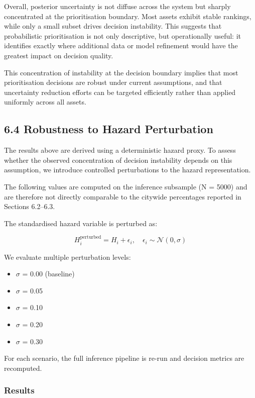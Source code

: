 \documentclass[
]{article}
\providecommand{\tightlist}{%
  \setlength{\itemsep}{0pt}\setlength{\parskip}{0pt}}
\begin{document}
Overall, posterior uncertainty is not diffuse across the system but
sharply concentrated at the prioritisation boundary. Most assets exhibit
stable rankings, while only a small subset drives decision instability.
This suggests that probabilistic prioritisation is not only descriptive,
but operationally useful: it identifies exactly where additional data or
model refinement would have the greatest impact on decision quality.

This concentration of instability at the decision boundary implies that
most prioritisation decisions are robust under current assumptions, and
that uncertainty reduction efforts can be targeted efficiently rather
than applied uniformly across all assets.

\subsection{6.4 Robustness to Hazard
Perturbation}\label{robustness-to-hazard-perturbation}

The results above are derived using a deterministic hazard proxy. To
assess whether the observed concentration of decision instability
depends on this assumption, we introduce controlled perturbations to the
hazard representation.

The following values are computed on the inference subsample (N = 5000)
and are therefore not directly comparable to the citywide percentages
reported in Sections 6.2--6.3.

The standardised hazard variable is perturbed as:

\[
H_i^{\text{perturbed}} = H_i + \epsilon_i, \quad \epsilon_i \sim \mathcal{N}(0, \sigma)
\]

We evaluate multiple perturbation levels:

\begin{itemize}
\tightlist
\item
  \(\sigma\) = 0.00 (baseline)
\item
  \(\sigma\) = 0.05
\item
  \(\sigma\) = 0.10
\item
  \(\sigma\) = 0.20
\item
  \(\sigma\) = 0.30
\end{itemize}

For each scenario, the full inference pipeline is re-run and decision
metrics are recomputed.

\subsubsection{Results}\label{results-1}
\end{document}
